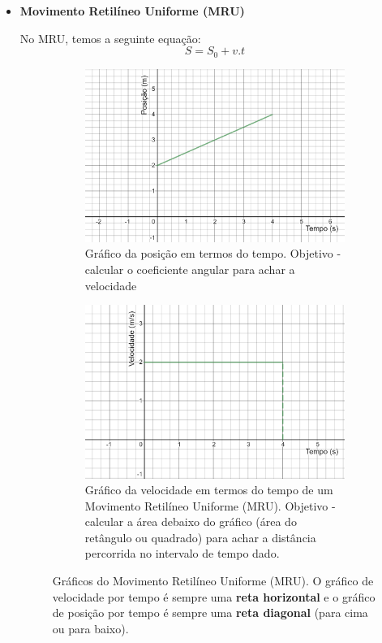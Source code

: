 \documentclass[12pt]{extarticle}
\newcommand{\<}{\langle}
\renewcommand{\>}{\rangle}
\theoremstyle{definition}
\begin{document}
\begin{itemize}
    \item \textbf{Movimento Retilíneo Uniforme (MRU)}
    
    No MRU, temos a seguinte equação:
    \begin{equation}
        S = S_0 + v.t
    \end{equation}
    \begin{figure}[H]
    \centering
    \begin{subfigure}[b]{0.4\textwidth}
         \centering
         \includegraphics[width=\textwidth]{pos_MRU.png}
         \caption{Gráfico da posição em termos do tempo. Objetivo - calcular o coeficiente angular para achar a velocidade}
         \label{fig:MRU_vel}
     \end{subfigure}
     \hfill
     \begin{subfigure}[b]{0.4\textwidth}
         \centering
         \includegraphics[width=\textwidth]{MRU_v.png}
         \caption{Gráfico da velocidade em termos do tempo de um Movimento Retilíneo Uniforme (MRU). Objetivo - calcular a área debaixo do gráfico (área do retângulo ou quadrado) para achar a distância percorrida no intervalo de tempo dado.}
         \label{fig:MRU_pos}
     \end{subfigure}
     \caption{Gráficos do Movimento Retilíneo Uniforme (MRU). O gráfico de velocidade por tempo é sempre uma \textbf{reta horizontal} e o gráfico de posição por tempo é sempre uma \textbf{reta diagonal} (para cima ou para baixo).}
     \label{fig:MRU_plots}
\end{figure}


\end{itemize}
\end{document}
